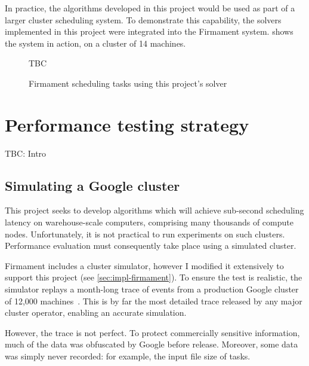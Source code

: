 In practice, the algorithms developed in this project would be used as part of a larger cluster scheduling system. To demonstrate this capability, the solvers implemented in this project were integrated into the Firmament system.  shows the system in action, on a cluster of 14 machines.

\begin{figure}
    TBC
    \caption{Firmament scheduling tasks using this project's solver}
    \label{fig:firmament-ui}
\end{figure}

\section{Performance testing strategy} \label{sec:eval-benchmark-strategy}

TBC: Intro

\subsection{Simulating a Google cluster}

This project seeks to develop algorithms which will achieve sub-second scheduling latency on warehouse-scale computers, comprising many thousands of compute nodes. Unfortunately, it is not practical to run experiments on such clusters. Performance evaluation must consequently take place using a simulated cluster\footnotemark.

Firmament includes a cluster simulator, however I modified it extensively to support this project (see \cref{sec:impl-firmament}). To ensure the test is realistic, the simulator replays a month-long trace of events from a production Google cluster of 12,000 machines~\cite{clusterdata:Wilkes2011,clusterdata:Reiss2011,Reiss:2012}. This is by far the most detailed trace released by any major cluster operator, enabling an accurate simulation.

However, the trace is not perfect. To protect commercially sensitive information, much of the data was obfuscated by Google before release. Moreover, some data was simply never recorded: for example, the input file size of tasks. 

